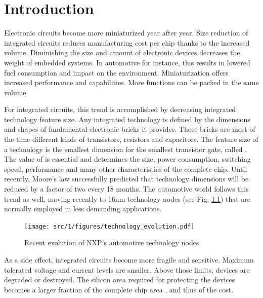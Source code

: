 \chapter{Introduction}

Electronic circuits become more miniaturized year after year.
Size reduction of integrated circuits reduces manufacturing cost per chip thanks to the increased volume.
Diminishing the size and amount of electronic devices decreases the weight of embedded systems.
In automotive for instance, this results in lowered fuel consumption and impact on the environment.
Miniaturization offers increased performance and capabilities.
More functions can be packed in the same volume.

For integrated circuits, this trend is accomplished by decreasing integrated technology feature size.
Any integrated technology is defined by the dimensions and shapes of fundamental electronic bricks it provides.
Those bricks are most of the time different kinds of transistors, resistors and capacitors.
The feature size of a technology is the smallest dimension for the smallest transistor gate, called \textlambda.
The value of \textlambda{} is essential and determines the size, power consumption, switching speed, performance and many other characteristics of the complete chip.
Until recently, Moore's law successfully predicted that technology dimensions will be reduced by a factor of two every 18 months.
The automotive world follows this trend as well, moving recently to 16nm technology nodes (see Fig. \ref{fig:nxp-techno-increase}) \cite{evolution_technologies} that are normally employed in less demanding applications.

\begin{figure}[!h]
  \centering
  \texttt{[image: src/1/figures/technology\_evolution.pdf]}
  \caption{Recent evolution of NXP's automotive technology nodes \cite{evolution_technologies}}
  \label{fig:nxp-techno-increase}
\end{figure}

As a side effect, integrated circuits become more fragile and sensitive.
Maximum tolerated voltage and current levels are smaller.
Above those limits, devices are degraded or destroyed.
The silicon area required for protecting the devices becomes a larger fraction of the complete chip area \cite{evolution_technologies}, and thus of the cost.

